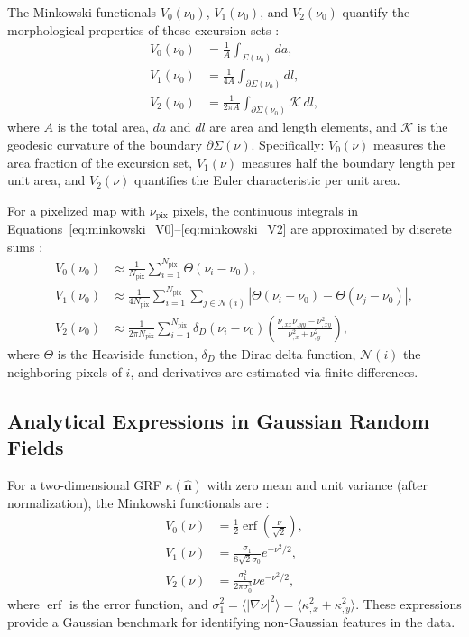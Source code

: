 The Minkowski functionals $V_0(\nu_0)$, $V_1(\nu_0)$, and $V_2(\nu_0)$ quantify the morphological properties of these excursion sets \citep{2010PhRvD..81h3505M}: 
\begin{align}
    V_0(\nu_0) &= \frac{1}{A} \int_{\Sigma(\nu_0)} da, \label{eq:minkowski_V0} \\
    V_1(\nu_0) &= \frac{1}{4A} \int_{\partial \Sigma(\nu_0)} dl, \label{eq:minkowski_V1} \\
    V_2(\nu_0) &= \frac{1}{2\pi A} \int_{\partial \Sigma(\nu_0)} \mathcal{K} \, dl, \label{eq:minkowski_V2}
\end{align}
where $A$ is the total area, $da$ and $dl$ are area and length elements, and $\mathcal{K}$ is the geodesic curvature of the boundary $\partial \Sigma(\nu)$. Specifically: $V_0(\nu)$ measures the area fraction of the excursion set, $V_1(\nu)$ measures half the boundary length per unit area, and $V_2(\nu)$ quantifies the Euler characteristic per unit area.

For a pixelized map with $\nu_{\mathrm{pix}}$ pixels, the continuous integrals in Equations~\eqref{eq:minkowski_V0}--\eqref{eq:minkowski_V2} are approximated by discrete sums \citep{2012PhRvD..85j3513K}:
\begin{align}
    V_0(\nu_0) &\approx \frac{1}{N_{\mathrm{pix}}} \sum_{i=1}^{N_{\mathrm{pix}}} \Theta(\nu_i - \nu_0), \label{eq:V0_discrete} \\
    V_1(\nu_0) &\approx \frac{1}{4N_{\mathrm{pix}}} \sum_{i=1}^{N_{\mathrm{pix}}} \sum_{j \in \mathcal{N}(i)} |\Theta(\nu_i - \nu_0) - \Theta(\nu_j - \nu_0)|, \label{eq:V1_discrete} \\
    V_2(\nu_0) &\approx \frac{1}{2\pi N_{\mathrm{pix}}} \sum_{i=1}^{N_{\mathrm{pix}}} \delta_D(\nu_i - \nu_0) \left( \frac{\nu_{,xx} \nu_{,yy} - \nu_{,xy}^2}{\nu_{,x}^2 + \nu_{,y}^2} \right), \label{eq:V2_discrete}
\end{align}
where $\Theta$ is the Heaviside function, $\delta_D$ the Dirac delta function, $\mathcal{N}(i)$ the neighboring pixels of $i$, and derivatives are estimated via finite differences.

\subsection{Analytical Expressions in Gaussian Random Fields}
For a two-dimensional GRF $\kappa(\hat{\mathbf{n}})$ with zero mean and unit variance (after normalization), the Minkowski functionals are \citep{2010PhRvD..81h3505M}: 
\begin{align}
    V_0(\nu) &= \frac{1}{2} \operatorname{erf}\left( \frac{\nu}{\sqrt{2}} \right), \label{eq:V0_GRF} \\
    V_1(\nu) &= \frac{\sigma_1}{8\sqrt{2}\sigma_0} e^{-\nu^2/2}, \label{eq:V1_GRF} \\
    V_2(\nu) &= \frac{\sigma_1^2}{2\pi \sigma_0^3} \nu e^{-\nu^2/2}, \label{eq:V2_GRF}
\end{align}
where $\operatorname{erf}$ is the error function, and $\sigma_1^2 = \langle |\nabla \nu|^2 \rangle = \langle \kappa_{,x}^2 + \kappa_{,y}^2 \rangle$. These expressions provide a Gaussian benchmark for identifying non-Gaussian features in the data.
